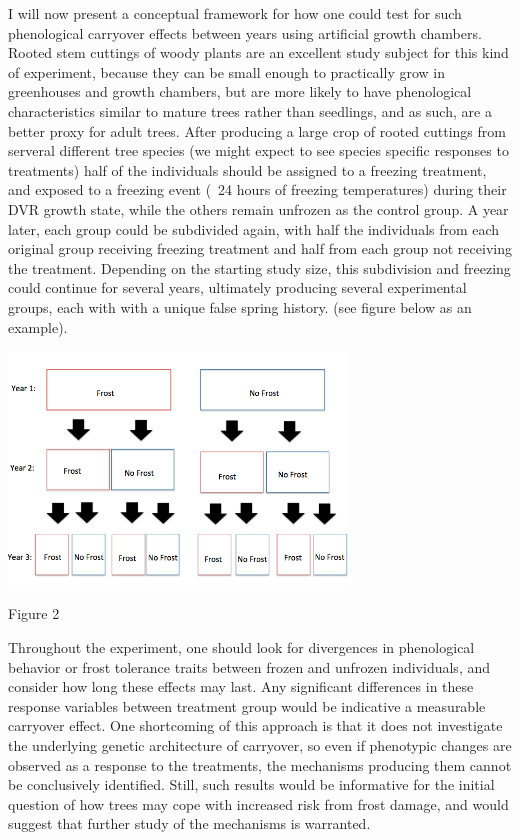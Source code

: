\documentclass{article}\usepackage[]{graphicx}\usepackage[]{color}
\begin{document}
\par I will now present a conceptual framework for how one could test for such phenological carryover effects between years using artificial growth chambers. Rooted stem cuttings of woody plants are an excellent study subject for this kind of experiment, because they can be small enough to practically grow in greenhouses and growth chambers, but are more likely to have phenological characteristics similar to mature trees rather than seedlings, and as such, are a better proxy for adult trees. After producing a large crop of rooted cuttings from serveral different tree species (we might expect to see species specific responses to treatments) half of the individuals should be assigned to a freezing treatment, and exposed to a freezing event (~24 hours of freezing temperatures) during their DVR growth state, while the others remain unfrozen as the control group. A year later, each group could be subdivided again, with half the individuals from each original group receiving freezing treatment and half from each group not receiving the treatment. Depending on the starting study size, this subdivision and freezing could continue for several years, ultimately producing several experimental groups, each with with a unique false spring history. (see figure below as an example).\\
\begin{center}
\includegraphics[width=9cm] {carryover_diagram}
\caption{Figure 2}
\end{center}
Throughout the experiment, one should look for divergences in phenological behavior or frost tolerance traits between frozen and unfrozen individuals, and consider how long these effects may last. Any significant differences in these response variables between treatment group would be indicative a measurable carryover effect. One shortcoming of this approach is that it does not investigate the underlying genetic architecture of carryover, so even if phenotypic changes are observed as a response to the treatments, the mechanisms producing them cannot be conclusively identified. Still, such results would be informative for the initial question of how trees may cope with increased risk from frost damage, and would suggest that further study of the mechanisms is warranted.
\end{document}
